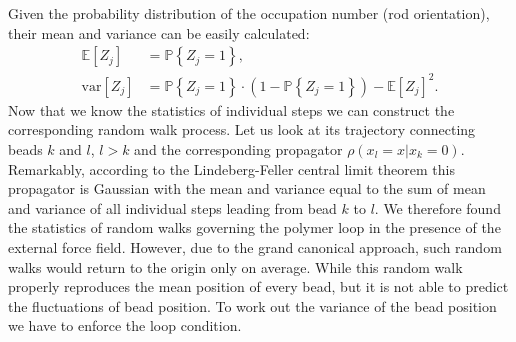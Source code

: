 \documentclass[aps,showpacs,twocolumn,floatfix,prx,superscriptaddress]{revtex4-1}
\begin{document}
Given the probability distribution of the occupation number (rod orientation), their mean
and variance can be easily
calculated:
\begin{subequations}
    \begin{align}
        \label{eq:zmean}
        \mathbb{E}\left[Z_j\right] & =  \mathbb{P} \left\{ Z_j = 1\right\} ,\\
        \label{eq:zvar}
        \text{var}\left[Z_j\right] & = \mathbb{P} \left\{ Z_j = 1\right\} \cdot
        \left( 1 - \mathbb{P} \left\{ Z_j = 1\right\} \right) -
        \mathbb{E}\left[Z_j\right]^2.
    \end{align}
\end{subequations}
Now that we know the statistics of individual steps we can construct the corresponding random walk process. Let us look at its trajectory connecting beads $k$ and $l$, $l>k$ and the corresponding propagator $\rho(x_l=x|x_k=0)$. Remarkably, according to the Lindeberg-Feller central limit theorem \cite{} this propagator is  Gaussian with the mean and variance equal to the sum of mean and variance of all individual steps leading from bead $k$ to $l$. We therefore found the statistics of random walks governing the polymer loop in the presence of the external force field. However, due to the grand canonical approach, such random walks would return to the origin only on average. While this random walk properly reproduces the mean position of every bead, but it is not able to predict the fluctuations of bead position. To work out the variance of the bead position we have to enforce the loop condition.
 
\end{document}
